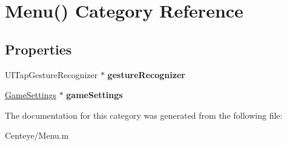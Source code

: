 \hypertarget{category_menu_07_08}{\section{Menu() Category Reference}
\label{category_menu_07_08}
}
\subsection*{Properties}
\begin{DoxyCompactItemize}
\item 
\hypertarget{category_menu_07_08_a84cf7df2b70e4eee6af3643e20e2bc78}{U\+I\+Tap\+Gesture\+Recognizer $\ast$ {\bfseries gesture\+Recognizer}}\label{category_menu_07_08_a84cf7df2b70e4eee6af3643e20e2bc78}

\item 
\hypertarget{category_menu_07_08_a5aca08847fac2ea9c4bdad900297e13f}{\hyperlink{interface_game_settings}{Game\+Settings} $\ast$ {\bfseries game\+Settings}}\label{category_menu_07_08_a5aca08847fac2ea9c4bdad900297e13f}

\end{DoxyCompactItemize}


The documentation for this category was generated from the following file\+:\begin{DoxyCompactItemize}
\item 
Centeye/Menu.\+m\end{DoxyCompactItemize}
